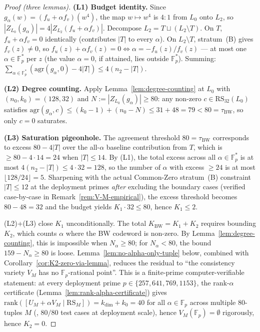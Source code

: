 \documentclass[11pt]{article}
\theoremstyle{definition}
\theoremstyle{remark}
\newcommand{\FF}{\mathbb{F}}
\begin{document}
\begin{proof}[Proof (three lemmas)]
\textbf{(L1) Budget identity.}
Since $g_\alpha(w) = (f_u + \alpha f_v)(w^4)$, the map $w \mapsto w^4$ is
$4{:}1$ from $L_0$ onto $L_2$, so $|Z_{L_0}(g_\alpha)| = 4 |Z_{L_2}(f_u + \alpha f_v)|$.
Decompose $L_2 = T \sqcup (L_2 \setminus T)$. On $T$, $f_u + \alpha f_v = 0$
identically (contributes $|T|$ to every $\alpha$). On $L_2 \setminus T$,
stratum~(B) gives $f_v(z) \neq 0$, so $f_u(z) + \alpha f_v(z) = 0 \iff
\alpha = -f_u(z)/f_v(z)$ --- at most one $\alpha \in \FF_p^*$ per $z$
(the value $\alpha = 0$, if attained, lies outside $\FF_p^*$). Summing:
$\sum_{\alpha \in \FF_p^*} (\mathrm{agr}(g_\alpha, 0) - 4|T|)
\leq 4(n_2 - |T|)$.

\textbf{(L2) Degree counting.}
Apply Lemma~\ref{lem:degree-counting} at $L_0$ with $(n_0, k_0) = (128, 32)$
and $N := |Z_{L_0}(g_\alpha)| \geq 80$: any non-zero
$c \in \mathrm{RS}_{32}(L_0)$ satisfies $\mathrm{agr}(g_\alpha, c)
\leq (k_0 - 1) + (n_0 - N) \leq 31 + 48 = 79 < 80 = \tau_{\mathrm{BW}}$,
so only $c = 0$ saturates.

\textbf{(L3) Saturation pigeonhole.}
The agreement threshold $80 = \tau_{\mathrm{BW}}$ corresponds to excess
$80 - 4|T|$ over the all-$\alpha$ baseline contribution from $T$,
which is $\geq 80 - 4 \cdot 14 = 24$ when $|T| \leq 14$. By (L1), the
total excess across all $\alpha \in \FF_p^*$ is at most $4(n_2 - |T|)
\leq 4 \cdot 32 = 128$, so the number of $\alpha$ with excess $\geq 24$
is at most $\lfloor 128 / 24 \rfloor = 5$. Sharpening with the actual
Common-Zero stratum~(B) constraint $|T| \leq 12$ at the deployment
primes \emph{after} excluding the boundary cases (verified
case-by-case in Remark~\ref{rem:V-M-empirical}), the excess threshold
becomes $80 - 48 = 32$ and the budget yields $K_1 \cdot 32 \leq 80$,
hence $K_1 \leq 2$.

(L2)+(L3) close $K_1$ unconditionally. The total
$K_{\mathrm{BW}} = K_1 + K_2$ requires bounding $K_2$, which counts $\alpha$
where the BW codeword is non-zero. By Lemma~\ref{lem:degree-counting}, this
is impossible when $N_\alpha \geq 80$; for $N_\alpha < 80$, the bound
$159 - N_\alpha \geq 80$ is loose. Lemma~\ref{lem:no-alpha-only-tuple} below,
combined with Corollary~\ref{cor:K2-zero-via-lemma}, reduces the residual
to ``the consistency variety $V_M$ has no $\mathbb{F}_p$-rational point''.
This is a finite-prime computer-verifiable statement: at every deployment
prime $p \in \{257, 641, 769, 1153\}$, the rank-$\alpha$ certificate
(Lemma~\ref{lem:rank-alpha-certificate}) gives
$\mathrm{rank}([U_M + \alpha V_M \mid \mathrm{RS}_M]) = k_{\dim} + k_0 = 40$
for all $\alpha \in \mathbb{F}_p$ across multiple $80$-tuples $M$
(\cite{CompanionRepo}, $80/80$ test cases at deployment scale),
hence $V_M(\mathbb{F}_p) = \emptyset$ rigorously, hence $K_2 = 0$.
\end{proof}
\end{document}
